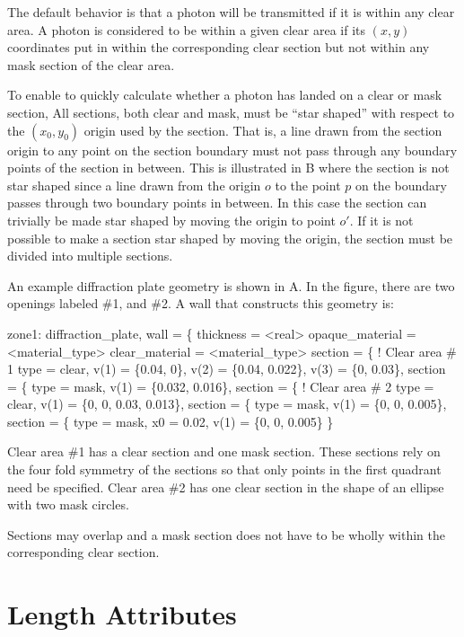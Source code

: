 The default behavior is that a photon will be transmitted if it is
within any clear area. A photon is considered to be within a given
clear area if its $(x,y)$ coordinates put in within the corresponding
clear section but not within any mask section of the clear area.



To enable \bmad to quickly calculate whether a photon has landed on a
clear or mask section, All sections, both clear and mask, must be
``star shaped'' with respect to the $(x_0, y_0)$ origin used by the
section. That is, a line drawn from the section origin to any point on
the section boundary must not pass through any boundary points of the
section in between. This is illustrated in B where
the section is not star shaped since a line drawn from the origin $o$
to the point $p$ on the boundary passes through two boundary points in
between. In this case the section can trivially be made star shaped by
moving the origin to point $o'$. If it is not possible to make a
section star shaped by moving the origin, the section must be divided
into multiple sections.

An example diffraction plate geometry is shown in A.
In the figure, there are two openings labeled \#1, and \#2. A
wall that constructs this geometry is:
\begin{example}
  zone1: diffraction_plate, wall = \{
    thickness = <real>
    opaque_material = <material_type>
    clear_material = <material_type>
    section = \{           ! Clear area \# 1
      type = clear, 
      v(1) = \{0.04, 0\}, v(2) = \{0.04, 0.022\},
      v(3) = \{0, 0.03\},
    section = \{
      type = mask,
      v(1) = \{0.032, 0.016\},
    section = \{          ! Clear area \# 2
      type = clear,
      v(1) = \{0, 0, 0.03, 0.013\},
    section = \{
      type = mask,
      v(1) = \{0, 0, 0.005\},
    section = \{
      type = mask,
      x0 = 0.02,
      v(1) = \{0, 0, 0.005\} \}
\end{example}
Clear area \#1 has a clear section and one mask section. These
sections rely on the four fold symmetry of the sections so that only
points in the first quadrant need be specified. Clear area \#2 has one
clear section in the shape of an ellipse with two mask circles.

Sections may overlap and a mask section does not have to be wholly
within the corresponding clear section.

\section{Length Attributes}
\label{s:l}

